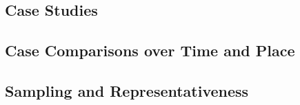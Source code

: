 \documentclass[12pt,a4paper]{article}
\begin{document}
\subsection{Case Studies}

\subsection{Case Comparisons over Time and Place}



\subsection{Sampling and Representativeness}
\end{document}
